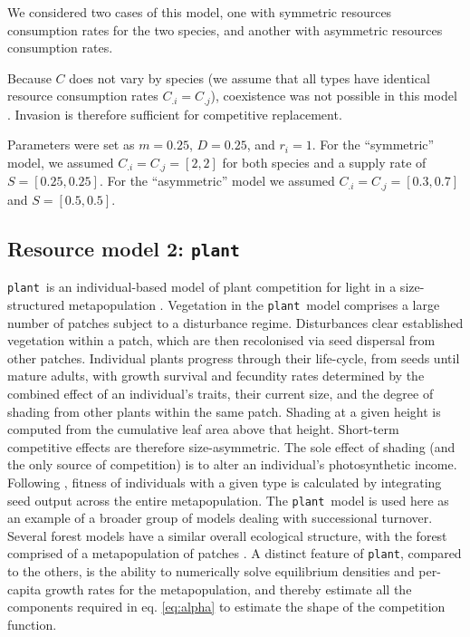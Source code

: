 \documentclass[a4paper,11pt]{article}
\newcommand{\plant}{{\tt plant}}
\begin{document}
We considered two cases of this model, one with symmetric resources consumption rates for the two species, and another with asymmetric resources consumption rates.

Because $C$ does not vary by species (we assume that all types have identical resource consumption rates $C_{.i} = C_{.j}$), coexistence was not possible in this model \citep{Tilman-1982}. Invasion is therefore sufficient for competitive replacement.

Parameters were set as $m = 0.25$, $D=0.25$, and $r_i = 1$. For the ``symmetric'' model, we assumed $C_{.i} = C_{.j} = [2,2]$ for both species and a supply rate of $S = [0.25, 0.25]$.  For the ``asymmetric'' model we assumed $C_{.i} = C_{.j} = [0.3,0.7]$ and $S = [0.5, 0.5]$.

\subsection{Resource model 2: \plant }

\plant\ is an individual-based model of plant competition for light in a size-structured metapopulation \citep{Falster-2016, Falster-2017}. Vegetation in the \plant\ model comprises a large number of patches subject to a disturbance regime. Disturbances clear established vegetation within a patch, which are then recolonised via seed dispersal from other patches. Individual plants progress through their life-cycle, from seeds until mature adults, with growth survival and fecundity rates determined by the combined effect of an individual's traits, their current size, and the degree of shading from other plants within the same patch. Shading at a given height is computed from the cumulative leaf area above that height. Short-term competitive effects are therefore size-asymmetric. The sole effect of shading (and the only source of competition) is to alter an individual's photosynthetic income. Following \citep{Falster-2017}, fitness of individuals with a given type is calculated by integrating seed output across the entire metapopulation. The \plant\ model is used here as an example of a broader group of models dealing with successional turnover. Several forest models have a similar overall ecological structure, with the forest comprised of a metapopulation of patches \citep{Huston-1987,Kohyama-1993,Moorcroft-2001, Medvigy-2012, Smith-2014}. A distinct feature of \plant, compared to the others, is the ability to numerically solve equilibrium densities and per-capita growth rates for the metapopulation, and thereby estimate all the components required in eq. \ref{eq:alpha} to estimate the shape of the competition function.
\end{document}
